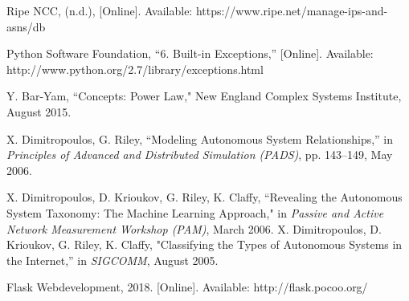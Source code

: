 \documentclass[conference, 11pt]{IEEEtran}
\begin{document}
\begin{thebibliography}{00}
Ripe NCC, (n.d.), [Online]. Available: https://www.ripe.net/manage-ips-and-asns/db %

Python Software Foundation, ``6. Built-in Exceptions,'' [Online]. Available: http://www.python.org/2.7/library/exceptions.html %

 Y. Bar-Yam, ``Concepts: Power Law," New England Complex Systems Institute, August 2015. %

X. Dimitropoulos, G. Riley, ``Modeling Autonomous System Relationships,'' in \textit{Principles of Advanced and Distributed Simulation (PADS)}, pp. 143--149, May 2006. %



X. Dimitropoulos, D. Krioukov, G. Riley, K. Claffy, ``Revealing the Autonomous System Taxonomy: The Machine Learning Approach," in \textit{Passive and Active Network Measurement Workshop (PAM)}, March 2006. %
X. Dimitropoulos, D. Krioukov, G. Riley, K. Claffy, "Classifying the Types of Autonomous Systems in the Internet,'' in \textit{SIGCOMM}, August 2005. %



Flask Webdevelopment, 2018. [Online]. Available: http://flask.pocoo.org/



\end{thebibliography}
\end{document}
